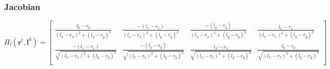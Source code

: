 \documentclass[12pt, a4paper]{article}
\begin{document}
\subsubsection{Jacobian}
\[H_l(\mathbf{r}^t, \mathbf{l}^{k}) = \begin{bmatrix}
  \frac{l_y - r_y}{(l_x - r_x)^2 + (l_y - r_y)^2} & \frac{-(l_x - r_x)}{(l_x - r_x)^2 + (l_y - r_y)^2} & \frac{-(l_y - r_y)}{(l_x - r_x)^2 + (l_y - r_y)^2} & \frac{l_x - r_x}{(l_x - r_x)^2 + (l_y - r_y)^2}\\
  \frac{-(l_x - r_x)}{\sqrt{(l_x - r_x)^2 + (l_y - r_y)^2}} & \frac{-(l_y - r_y)}{\sqrt{(l_x - r_x)^2 + (l_y - r_y)^2}} & \frac{l_x - r_x}{\sqrt{(l_x - r_x)^2 + (l_y - r_y)^2}} & \frac{l_y - r_y}{\sqrt{(l_x - r_x)^2 + (l_y - r_y)^2}}\\
\end{bmatrix}\]
\end{document}
